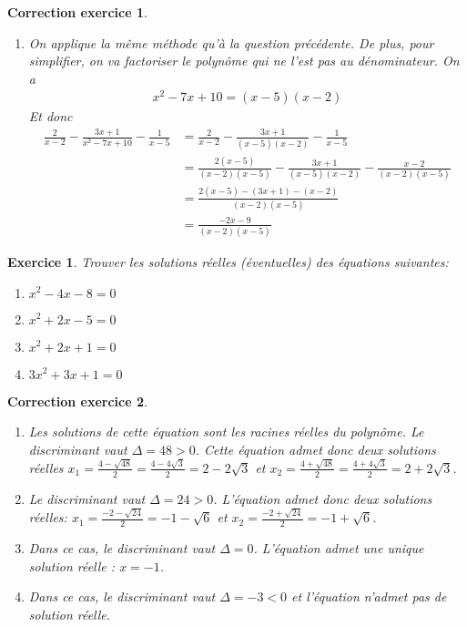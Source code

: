 \documentclass[12pt]{article}
\newtheorem{exercice}{\bf Exercice}
\newtheorem{correction}{\bf Correction exercice}
\newenvironment{exo}{
\begin{exercice}\smallskip\normalfont}{\end{exercice}
}
\newenvironment{cor}{
\begin{correction}\smallskip\normalfont}{\end{correction}
}
\newif\ifcorrige\corrigetrue
\begin{document}
\begin{cor}
\begin{enumerate}
\item On applique la m\^eme m\'ethode qu'\`a la question pr\'ec\'edente.
  De plus, pour simplifier, on va factoriser le polyn\^ome qui ne l'est pas au d\'enominateur.
  On a
  \begin{align*}
    x^2-7x+10 = (x-5)(x-2)
  \end{align*}
  Et donc
  \begin{align*}
    \frac{2}{x-2} - \frac{3x+1}{x^2-7x+10} - \frac{1}{x-5}
    &= \frac{2}{x-2} - \frac{3x+1}{(x-5)(x-2)} - \frac{1}{x-5}
    \\
    &= \frac{2(x-5)}{(x-2)(x-5)} - \frac{3x+1}{(x-5)(x-2)} - \frac{x-2}{(x-2)(x-5)}
    \\
    &= \frac{2(x-5) - (3x+1) - (x-2)}{(x-2)(x-5)}
    \\
    &= \frac{-2x - 9}{(x-2)(x-5)}
  \end{align*}
\end{enumerate}
\end{cor}
\color{black}
\fi



\begin{exo} Trouver les solutions r\'eelles (\'eventuelles) des \'equations suivantes:
\begin{multicols}{2}
\begin{enumerate}
\item $x^2 - 4x - 8 = 0$
\item $x^2 + 2x - 5 = 0$
\item $x^2 + 2x + 1 = 0$
\item $3x^2 + 3x + 1 = 0$
\end{enumerate}
\end{multicols}
\end{exo}

\ifcorrige
\color{magenta}
\begin{cor}
  $\qquad$
\begin{enumerate}
\item Les solutions de cette \'equation sont les racines r\'eelles du polyn\^ome.
  Le discriminant vaut $\Delta = 48 > 0$.
  Cette \'equation admet donc deux solutions r\'eelles
  $x_1 = \frac{4 - \sqrt{48}}{2} = \frac{4 - 4\sqrt{3}}{2} = 2 - 2\sqrt{3}$
  et
  $x_2 = \frac{4 + \sqrt{48}}{2} = \frac{4 + 4\sqrt{3}}{2} = 2 + 2\sqrt{3}$.
\item Le discriminant vaut $\Delta = 24 > 0$.
  L'\'equation admet donc deux solutions r\'eelles:
  $x_1 = \frac{-2 - \sqrt{24}}{2} = -1 - \sqrt{6}$
  et $x_2 = \frac{-2 + \sqrt{24}}{2} = -1 + \sqrt{6}$.
\item Dans ce cas, le discriminant vaut $\Delta = 0$.
  L'\'equation admet une unique solution r\'eelle : $x = -1$.
\item Dans ce cas, le discriminant vaut $\Delta = -3 < 0$
  et l'\'equation n'admet pas de solution r\'eelle.
\end{enumerate}
\end{cor}
\color{black}
\fi
\end{document}
